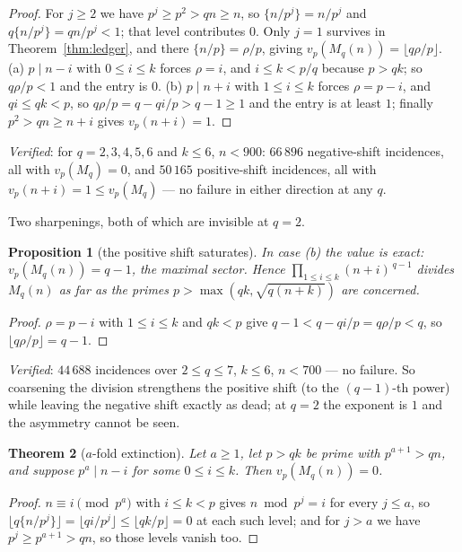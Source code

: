 \documentclass[11pt]{article}
\newtheorem{theorem}{Theorem}
\newtheorem{proposition}[theorem]{Proposition}
\begin{document}
\begin{proof}
For $j\ge2$ we have $p^{j}\ge p^{2}>qn\ge n$, so $\{n/p^{j}\}=n/p^{j}$ and
$q\{n/p^{j}\}=qn/p^{j}<1$; that level contributes $0$.  Only $j=1$ survives in
Theorem~\ref{thm:ledger}, and there $\{n/p\}=\rho/p$, giving
$v_p(M_q(n))=\lfloor q\rho/p\rfloor$.
(a) $p\mid n-i$ with $0\le i\le k$ forces $\rho=i$, and $i\le k<p/q$ because $p>qk$; so
$q\rho/p<1$ and the entry is $0$.  (b) $p\mid n+i$ with $1\le i\le k$ forces $\rho=p-i$, and
$qi\le qk<p$, so $q\rho/p=q-qi/p>q-1\ge1$ and the entry is at least $1$; finally
$p^{2}>qn\ge n+i$ gives $v_p(n+i)=1$.
\end{proof}

\emph{Verified}: for $q=2,3,4,5,6$ and $k\le6$, $n<900$: $66\,896$ negative-shift incidences,
all with $v_p(M_q)=0$, and $50\,165$ positive-shift incidences, all with
$v_p(n+i)=1\le v_p(M_q)$ --- no failure in either direction at any $q$.

Two sharpenings, both of which are invisible at $q=2$.

\begin{proposition}[the positive shift saturates]\label{prop:sat}
In case \textup{(b)} the value is exact: $v_p(M_q(n))=q-1$, the maximal sector.  Hence
$\prod_{1\le i\le k}(n+i)^{\,q-1}$ divides $M_q(n)$ as far as the primes
$p>\max(qk,\sqrt{q(n+k)})$ are concerned.
\end{proposition}

\begin{proof}
$\rho=p-i$ with $1\le i\le k$ and $qk<p$ give $q-1<q-qi/p=q\rho/p<q$, so
$\lfloor q\rho/p\rfloor=q-1$.
\end{proof}

\emph{Verified}: $44\,688$ incidences over $2\le q\le7$, $k\le6$, $n<700$ --- no failure.  So
coarsening the division strengthens the positive shift (to the $(q-1)$-th power) while leaving
the negative shift exactly as dead; at $q=2$ the exponent is $1$ and the asymmetry cannot be
seen.

\begin{theorem}[$a$-fold extinction]\label{thm:afold}
Let $a\ge1$, let $p>qk$ be prime with $p^{a+1}>qn$, and suppose $p^{a}\mid n-i$ for some
$0\le i\le k$.  Then $v_p(M_q(n))=0$.
\end{theorem}

\begin{proof}
$n\equiv i\pmod{p^{a}}$ with $i\le k<p$ gives $n\bmod p^{j}=i$ for every $j\le a$, so
$\lfloor q\{n/p^{j}\}\rfloor=\lfloor qi/p^{j}\rfloor\le\lfloor qk/p\rfloor=0$ at each such
level; and for $j>a$ we have $p^{j}\ge p^{a+1}>qn$, so those levels vanish too.
\end{proof}
\end{document}
